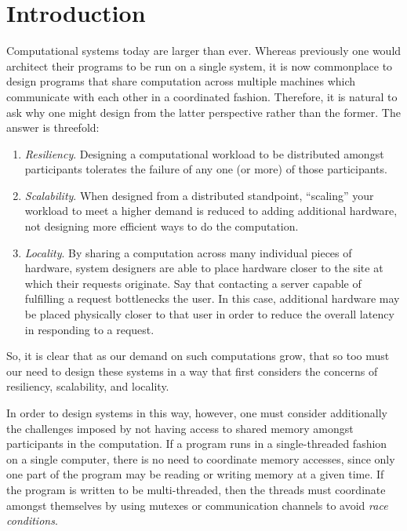 \chapter{Introduction}

Computational systems today are larger than ever. Whereas previously one would
architect their programs to be run on a single system, it is now commonplace to
design programs that share computation across multiple machines which
communicate with each other in a coordinated fashion. Therefore, it is natural
to ask why one might design from the latter perspective rather than the former.
The answer is threefold:
\begin{enumerate}
  \item \emph{Resiliency}. Designing a computational workload to be distributed
    amongst participants tolerates the failure of any one (or more) of those
    participants.
  \item \emph{Scalability}. When designed from a distributed standpoint,
    ``scaling'' your workload to meet a higher demand is reduced to adding
    additional hardware, not designing more efficient ways to do the
    computation.
  \item \emph{Locality}. By sharing a computation across many individual pieces
    of hardware, system designers are able to place hardware closer to the site
    at which their requests originate. Say that contacting a server capable of
    fulfilling a request bottlenecks the user. In this case, additional hardware
    may be placed physically closer to that user in order to reduce the overall
    latency in responding to a request.
\end{enumerate}

So, it is clear that as our demand on such computations grow, that so too
must our need to design these systems in a way that first considers the concerns
of resiliency, scalability, and locality.

In order to design systems in this way, however, one must consider additionally
the challenges imposed by not having access to shared memory amongst
participants in the computation. If a program runs in a single-threaded fashion
on a single computer, there is no need to coordinate memory accesses, since only
one part of the program may be reading or writing memory at a given time. If the
program is written to be multi-threaded, then the threads must coordinate
amongst themselves by using mutexes or communication channels to avoid
\textit{race conditions}.

